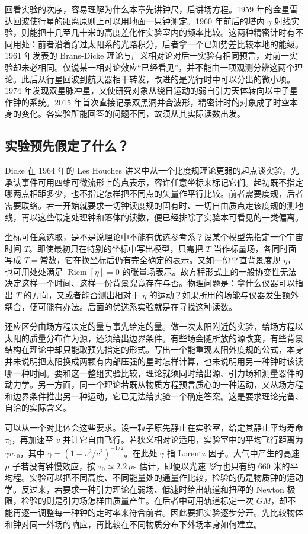 回看实验的次序，容易理解为什么本章先讲钟尺，后讲场方程。1959 年的金星雷达回波使行星的距离原则上可以用地面一只钟测定。1960 年前后的塔内 $\gamma$ 射线实验，则能把十几至几十米的高度差化作实验室内的频率比较。这两种精密计时有不同用处：前者沿着穿过太阳系的光路积分，后者拿一个已知势差比较本地的能级。1961 年发表的 Brans-Dicke 理论与广义相对论对后一实验有相同预言，对前一实验却未必相同。仅说某一相对论效应“已经看见”，并不能由一项观测分辨这两个理论。此后从行星回波到航天器相干转发，改进的是光行时中可以分出的微小项。1974 年发现双星脉冲星，又使研究对象从绕日运动的弱自引力天体转向以中子星作钟的系统。2015 年首次直接记录双黑洞并合波形，精密计时的对象成了时空本身的变化。各实验所能回答的问题不同，故须从其实际读数出发。

\subsection{实验预先假定了什么？}

Dicke 在 1964 年的 Les Houches 讲义中从一个比度规理论更弱的起点谈实验。先承认事件可用四维可微流形上的点表示，容许任意坐标来标记它们。起初既不指定哪两点相距多少，也不指定怎样把不同点的矢量作平行比较。前者需要度规，后者需要联络。若一开始就要求一切钟读度规的固有时、一切自由质点走该度规的测地线，再以这些假定处理钟和落体的读数，便已经排除了实验本可看见的一类偏离。

坐标可任意选取，是不是说理论中不能有优选参考系？设某个模型先指定一个宇宙时间 $T$。即使最初只在特别的坐标中写出模型，只需把 $T$ 当作标量场，各同时面写成 $T=\text{常数}$，它在换坐标后仍有完全确定的表示。又如一份平直背景度规 $\eta$，也可用处处满足 $\operatorname{Riem}[\eta]=0$ 的张量场表示。故方程形式上的一般协变性无法决定这样一个时间、这样一份背景究竟存在与否。物理问题是：拿什么仪器可以指出 $T$ 的方向，又或者能否测出相对于 $\eta$ 的运动？如果所用的场能与仪器发生额外耦合，便可能有办法。后面的优选系实验就是在寻找这种读数。

还应区分由场方程决定的量与事先给定的量。做一次太阳附近的实验，给场方程以太阳的质量分布作为源，还须给出边界条件。有些场会随所放的源改变，有些背景结构在理论中却只能取预先指定的形式。写出一个能重现太阳外度规的公式，本身并未说明把太阳换成两颗有内部压强的星时怎样计算，也未说明用另一种钟时该读哪一种时间。要和这一整组实验比较，理论就须同时给出源、引力场和测量器件的动力学。另一方面，同一个理论若既从物质方程预言质心的一种运动，又从场方程和边界条件推出另一种运动，它已无法给实验一个确定答案。这是要求理论完备、自洽的实际含义。

可以从一个对比体会这些要求。设一粒子原先静止在实验室，给定其静止平均寿命 $\tau_0$，再加速至 $v$ 并让它自由飞行。若狭义相对论适用，实验室中的平均飞行距离为 $\gamma v\tau_0$，其中 $\gamma=(1-v^2/c^2)^{-1/2}$。在此处 $\gamma$ 指 Lorentz 因子。大气中产生的高速 $\mu$ 子若没有钟慢效应，按 $\tau_0\simeq2.2\,\mu\mathrm s$ 估计，即便以光速飞行也只有约 $660$ 米的平均程。实验可以把不同高度、不同能量处的通量作比较，检验的仍是物质钟的运动学。反过来，若要求一种引力理论在弱场、低速时给出轨道和扭秤的 Newton 极限，检验的则是引力场怎样由质量产生。在后者中可用轨道标定一次 $GM$，却不能再逐一调整每一种钟的走时率来符合前者。因此要把实验逐步分开。先比较物体和钟对同一外场的响应，再比较在不同物质分布下外场本身如何建立。

